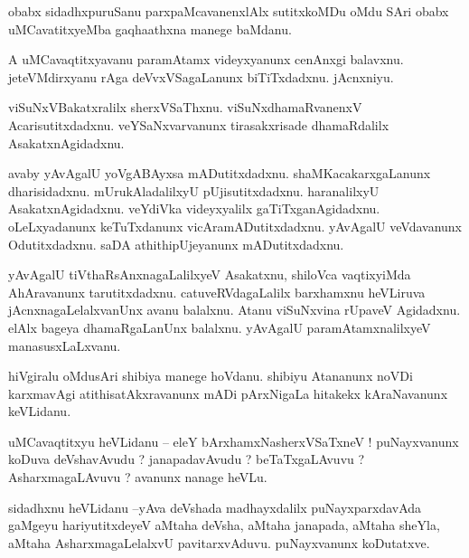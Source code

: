 \documentclass{article}
\begin{document}
\begin{mn}%
obabx sidadhxpuruSanu parxpaMcavanenxlAlx sutitxkoMDu oMdu SAri obabx uMCavatitxyeMba gaqhaathxna 
manege baMdanu.
\end{mn}

\begin{mn}%
A uMCavaqtitxyavanu paramAtamx videyxyanunx cenAnxgi balavxnu. jeteVMdirxyanu rAga deVvxVSagaLanunx 
biTiTxdadxnu. jAcnxniyu.
\end{mn}

\begin{mn}%
viSuNxVBakatxralilx sherxVSaThxnu. viSuNxdhamaRvanenxV Acarisutitxdadxnu. veYSaNxvarvanunx 
tirasakxrisade dhamaRdalilx AsakatxnAgidadxnu.
\end{mn}

\begin{mn}%
avaby yAvAgalU yoVgABAyxsa mADutitxdadxnu. shaMKacakarxgaLanunx dharisidadxnu. mUrukAladalilxyU 
pUjisutitxdadxnu. haranalilxyU AsakatxnAgidadxnu. veYdiVka videyxyalilx gaTiTxganAgidadxnu. 
oLeLxyadanunx keTuTxdanunx vicAramADutitxdadxnu. yAvAgalU veVdavanunx Odutitxdadxnu. saDA 
athithipUjeyanunx mADutitxdadxnu.
\end{mn}

\begin{mn}%
yAvAgalU tiVthaRsAnxnagaLalilxyeV Asakatxnu, shiloVca vaqtixyiMda AhAravanunx tarutitxdadxnu. 
catuveRVdagaLalilx barxhamxnu heVLiruva jAcnxnagaLelalxvanUnx avanu balalxnu. Atanu viSuNxvina 
rUpaveV Agidadxnu. elAlx bageya dhamaRgaLanUnx balalxnu. yAvAgalU paramAtamxnalilxyeV 
manasusxLaLxvanu.
\end{mn}

\begin{mn}%
hiVgiralu oMdusAri shibiya manege hoVdanu. shibiyu Atananunx noVDi karxmavAgi atithisatAkxravanunx 
mADi pArxNigaLa hitakekx kAraNavanunx keVLidanu.
\end{mn}

\begin{mn}%
uMCavaqtitxyu heVLidanu -- eleY bArxhamxNasherxVSaTxneV ! puNayxvanunx koDuva deVshavAvudu ? 
janapadavAvudu ? beTaTxgaLAvuvu ? AsharxmagaLAvuvu ? avanunx nanage heVLu.
\end{mn}

\begin{mn}%
sidadhxnu heVLidanu --yAva deVshada madhayxdalilx puNayxparxdavAda gaMgeyu hariyutitxdeyeV aMtaha 
deVsha, aMtaha janapada, aMtaha sheYla, aMtaha AsharxmagaLelalxvU pavitarxvAduvu. puNayxvanunx 
koDutatxve.
\end{mn}
\end{document}
